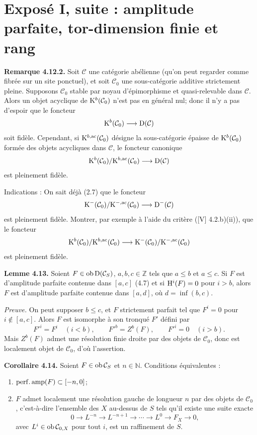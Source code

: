 \documentclass[11pt]{article}
\begin{document}
\section*{Exposé I, suite : amplitude parfaite, tor-dimension finie et rang}

\textbf{Remarque 4.12.2.} Soit \(\mathcal C\) une catégorie abélienne (qu'on peut regarder comme fibrée sur un site ponctuel), et soit \(\mathcal C_0\) une sous-catégorie additive strictement pleine. Supposons \(\mathcal C_0\) stable par noyau d'épimorphisme et quasi-relevable dans \(\mathcal C\). Alors un objet acyclique de \(\mathrm K^b(\mathcal C_0)\) n'est pas en général nul; donc il n'y a pas d'espoir que le foncteur
\[
  \mathrm K^b(\mathcal C_0)\longrightarrow \mathrm D(\mathcal C)
\]
soit fidèle. Cependant, si \(\mathrm K^{b,\mathrm{ac}}(\mathcal C_0)\) désigne la sous-catégorie épaisse de \(\mathrm K^b(\mathcal C_0)\) formée des objets acycliques dans \(\mathcal C\), le foncteur canonique
\[
  \mathrm K^b(\mathcal C_0)/\mathrm K^{b,\mathrm{ac}}(\mathcal C_0)
  \longrightarrow \mathrm D(\mathcal C)
\]
est pleinement fidèle.

Indications : On sait déjà (2.7) que le foncteur
\[
  \mathrm K^-(\mathcal C_0)/\mathrm K^{-,\mathrm{ac}}(\mathcal C_0)
  \longrightarrow \mathrm D^-(\mathcal C)
\]
est pleinement fidèle. Montrer, par exemple à l'aide du critère ([V] 4.2.b)(ii)), que le foncteur
\[
  \mathrm K^b(\mathcal C_0)/\mathrm K^{b,\mathrm{ac}}(\mathcal C_0)
  \longrightarrow
  \mathrm K^-(\mathcal C_0)/\mathrm K^{-,\mathrm{ac}}(\mathcal C_0)
\]
est pleinement fidèle.

\textbf{Lemme 4.13.} Soient \(F\in\operatorname{ob}\mathrm D(\mathcal C_S)\), \(a,b,c\in\mathbb Z\) tels que \(a\leq b\) et \(a\leq c\). Si \(F\) est d'amplitude parfaite contenue dans \([a,c]\) (4.7) et si \(\mathrm H^i(F)=0\) pour \(i>b\), alors \(F\) est d'amplitude parfaite contenue dans \([a,d]\), où \(d=\inf(b,c)\).

\emph{Preuve.} On peut supposer \(b\leq c\), et \(F\) strictement parfait tel que \(F^i=0\) pour \(i\notin[a,c]\). Alors \(F\) est isomorphe à son tronqué \(F'\) défini par
\[
  F'^i=F^i\quad (i<b),\qquad F'^b=Z^b(F),\qquad F'^i=0\quad (i>b).
\]
Mais \(Z^b(F)\) admet une résolution finie droite par des objets de \(\mathcal C_0\), donc est localement objet de \(\mathcal C_0\), d'où l'assertion.

\textbf{Corollaire 4.14.} Soient \(F\in\operatorname{ob}\mathcal C_S\) et \(n\in\mathbb N\). Conditions équivalentes :
\begin{enumerate}[label=(\roman*)]
\item \(\operatorname{perf.amp}(F)\subset[-n,0]\);
\item \(F\) admet localement une résolution gauche de longueur \(n\) par des objets de \(\mathcal C_0\), c'est-à-dire l'ensemble des \(X\) au-dessus de \(S\) tels qu'il existe une suite exacte
\[
  0\longrightarrow L^{-n}\longrightarrow L^{-n+1}\longrightarrow \cdots
  \longrightarrow L^0\longrightarrow F_X\longrightarrow 0,
\]
avec \(L^i\in\operatorname{ob}\mathcal C_{0,X}\) pour tout \(i\), est un raffinement de \(S\).
\end{enumerate}
\end{document}
